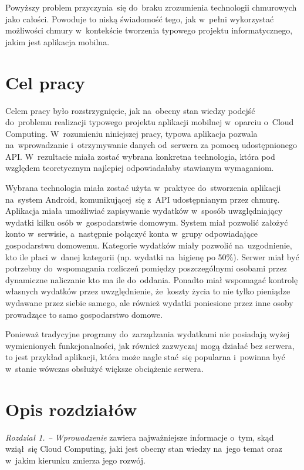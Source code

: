 \documentclass[12pt,a4paper,twoside,titlepage,openright]{book}
\begin{document}
Powyższy problem przyczynia~się do~braku zrozumienia technologii chmurowych jako całości. Powoduje to niską świadomość tego, jak w~pełni wykorzystać możliwości chmury w~kontekście tworzenia typowego projektu informatycznego, jakim jest aplikacja mobilna.





\section*{Cel pracy}


Celem pracy było rozstrzygnięcie, jak na~obecny stan wiedzy podejść do~problemu realizacji typowego projektu aplikacji mobilnej w~oparciu o~Cloud Computing. W~rozumieniu niniejszej pracy, typowa aplikacja pozwala na~wprowadzanie i~otrzymywanie danych od~serwera za pomocą udostępnionego API. W~rezultacie miała zostać wybrana konkretna technologia, która pod względem teoretycznym najlepiej odpowiadałaby stawianym wymaganiom.

Wybrana technologia miała zostać użyta w~praktyce do~stworzenia aplikacji na~system Android, komunikującej~się z~API udostępnianym przez chmurę. Aplikacja miała umożliwiać zapisywanie wydatków w~sposób uwzględniający wydatki kilku osób w~gospodarstwie domowym. System miał pozwolić założyć konto w~serwisie, a~następnie połączyć konta w~grupy odpowiadające gospodarstwu domowemu. Kategorie wydatków miały pozwolić na~uzgodnienie, kto ile płaci w~danej kategorii (np. wydatki na~higienę po 50\%). Serwer miał być potrzebny do~wspomagania rozliczeń pomiędzy poszczególnymi osobami przez dynamiczne naliczanie kto ma ile do~oddania. Ponadto miał wspomagać kontrolę własnych wydatków przez uwzględnienie, że~koszty życia to nie tylko pieniądze wydawane przez siebie samego, ale również wydatki poniesione przez inne osoby prowadzące to samo gospodarstwo domowe. 

Ponieważ tradycyjne programy do~zarządzania wydatkami nie posiadają wyżej wymienionych funkcjonalności, jak również zazwyczaj mogą działać bez serwera, to jest przykład aplikacji, która może nagle stać~się popularna i~powinna być w~stanie wówczas obsłużyć większe obciążenie serwera. 



\section*{Opis rozdziałów}
\textit{Rozdział 1. -- Wprowadzenie} zawiera najważniejsze informacje o~tym, skąd wziął~się Cloud Computing, jaki jest obecny stan wiedzy na~jego temat oraz w~jakim kierunku zmierza jego rozwój. 
\end{document}
